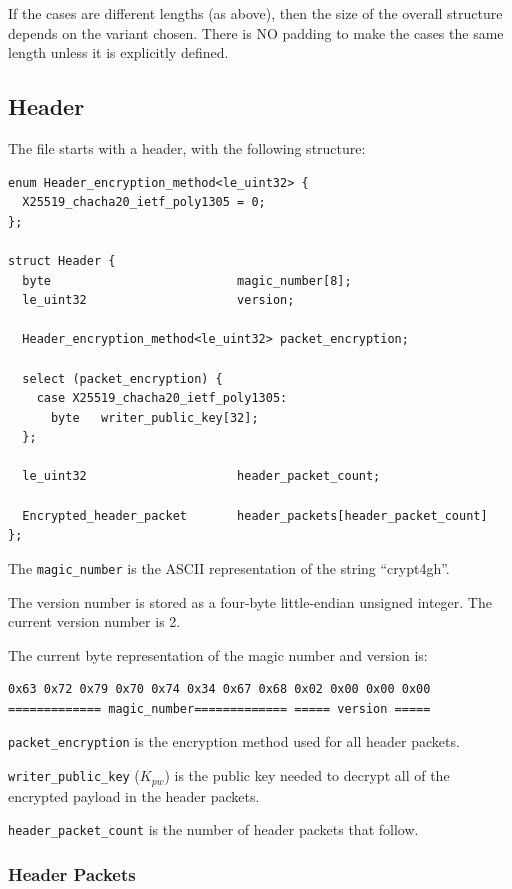 \documentclass[10pt]{article}
\newcommand{\kw}[1]{\texttt{#1}}
\begin{document}
If the cases are different lengths (as above), then the size of the overall structure depends on the variant chosen.
There is NO padding to make the cases the same length unless it is explicitly defined.

\subsection{Header}

The file starts with a header, with the following structure:

\begin{verbatim}
enum Header_encryption_method<le_uint32> {
  X25519_chacha20_ietf_poly1305 = 0;
};

struct Header {
  byte                          magic_number[8];
  le_uint32                     version;

  Header_encryption_method<le_uint32> packet_encryption;

  select (packet_encryption) {
    case X25519_chacha20_ietf_poly1305:
      byte   writer_public_key[32];
  };

  le_uint32                     header_packet_count;

  Encrypted_header_packet       header_packets[header_packet_count]
};
\end{verbatim}

The \kw{magic\_number} is the ASCII representation of the string ``crypt4gh''.

The version number is stored as a four-byte little-endian unsigned integer.
The current version number is 2.

The current byte representation of the magic number and version is:
\begin{verbatim}
0x63 0x72 0x79 0x70 0x74 0x34 0x67 0x68 0x02 0x00 0x00 0x00
============= magic_number============= ===== version =====
\end{verbatim}

\kw{packet\_encryption} is the encryption method used for all header packets.

\kw{writer\_public\_key} ($K_{pw}$) is the public key needed to decrypt
all of the encrypted payload in the header packets.

\kw{header\_packet\_count} is the number of header packets that follow.

\subsubsection{Header Packets}\label{header:encryption}
\end{document}

